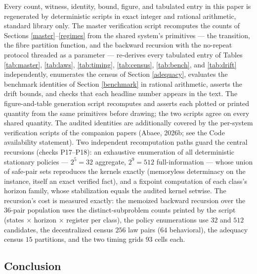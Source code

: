 \documentclass[10pt,twocolumn]{article}
\theoremstyle{definition}
\begin{document}
Every count, witness, identity, bound, figure, and tabulated entry in
this paper is regenerated by deterministic scripts in exact integer and
rational arithmetic, standard library only. The master verification
script recomputes the counts of Sections \ref{master}--\ref{regimes}
from the shared system's primitives --- the transition, the fibre
partition function, and the backward recursion with the no-repeat
protocol threaded as a parameter --- re-derives every tabulated entry of
Tables \ref{tab:master}, \ref{tab:laws}, \ref{tab:timing},
\ref{tab:census}, \ref{tab:bench}, and \ref{tab:drift} independently,
enumerates the census of Section \ref{adequacy}, evaluates the
benchmark identities of Section \ref{benchmark} in rational
arithmetic, asserts the drift bounds, and checks that each headline
number appears in the text. The figure-and-table generation script
recomputes and asserts each plotted or printed quantity from the same
primitives before drawing; the two scripts agree on every shared
quantity. The audited identities are additionally covered by the
per-system verification scripts of the companion papers (Abaee, 2026b;
see the Code availability statement). Two independent recomputation
paths guard the central recursions (checks P17--P18): an exhaustive
enumeration of all deterministic stationary policies --- \(2^{5} = 32\)
aggregate, \(2^{9} = 512\) full-information --- whose union of
safe-pair sets reproduces the kernels exactly (memoryless determinacy
on the instance, itself an exact verified fact), and a fixpoint
computation of each class's horizon family, whose stabilization equals
the audited kernel setwise. The recursion's cost is measured exactly:
the memoized backward recursion over the \(36\)-pair population uses
the distinct-subproblem counts printed by the script (states \(\times\)
horizon \(\times\) register per class), the policy enumerations use
\(32\) and \(512\) candidates, the decentralized census \(256\) law
pairs (\(64\) behavioral), the adequacy census \(15\) partitions, and
the two timing grids \(93\) cells each.

\subsection{Conclusion}\label{conclusion}
\end{document}
